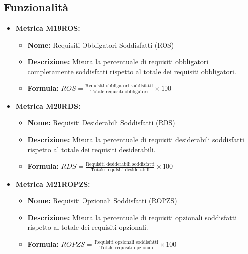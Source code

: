 \subsection{Funzionalità}
\begin{itemize}
    \item \textbf{Metrica M19ROS:}
          \begin{itemize}
              \item \textbf{Nome:} Requisiti Obbligatori Soddisfatti (ROS)
              \item \textbf{Descrizione:} Misura la percentuale di requisiti obbligatori completamente soddisfatti rispetto al totale dei requisiti obbligatori.
              \item \textbf{Formula:} $ROS = \frac{\text{Requisiti obbligatori soddisfatti}}{\text{Totale requisiti obbligatori}} \times 100$
          \end{itemize}

    \item \textbf{Metrica M20RDS:}
          \begin{itemize}
              \item \textbf{Nome:} Requisiti Desiderabili Soddisfatti (RDS)
              \item \textbf{Descrizione:} Misura la percentuale di requisiti desiderabili soddisfatti rispetto al totale dei requisiti desiderabili.
              \item \textbf{Formula:} $RDS = \frac{\text{Requisiti desiderabili soddisfatti}}{\text{Totale requisiti desiderabili}} \times 100$
          \end{itemize}

    \item \textbf{Metrica M21ROPZS:}
          \begin{itemize}
              \item \textbf{Nome:} Requisiti Opzionali Soddisfatti (ROPZS)
              \item \textbf{Descrizione:} Misura la percentuale di requisiti opzionali soddisfatti rispetto al totale dei requisiti opzionali.
              \item \textbf{Formula:} $ROPZS = \frac{\text{Requisiti opzionali soddisfatti}}{\text{Totale requisiti opzionali}} \times 100$
          \end{itemize}
\end{itemize}

